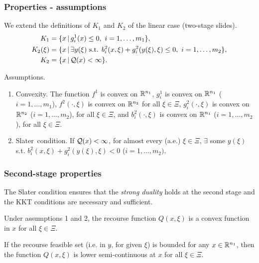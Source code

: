 \documentclass[aspectratio=169]{beamer}
\begin{document}
\begin{frame}
	\frametitle{Properties - assumptions}
	
	We extend the definitions of $K_1$ and $K_2$ of the linear case (two-stage slides).
	\begin{align*}
		K_1 &= \lbrace x \,|\, g_i^1(x) \leq 0,\ i = 1,\ldots,m_1 \rbrace,\\
		K_2(\xi) &= \lbrace x \,|\, \exists y(\xi) \mbox{ s.t. } b_i^2(x,\xi) +
		g_i^2(y(\xi),\xi) \leq 0,\ i = 1,\ldots,m_2 \rbrace,\\
		K_2 &= \lbrace x \,|\, {\mathcal{Q}}(x) < \infty \rbrace.
	\end{align*}
	
	{\blue Assumptions}.
	\begin{enumerate}
		\item \mbox{\red Convexity}.
		The function $f^1$ is convex on ${\mathbb{R}}^{n_1}$, $g_i^1$ is convex on ${\mathbb{R}}^{n_1}$ ($i =
		1,\ldots,m_1$), $f^2(\cdot,\xi)$ is convex on ${\mathbb{R}}^{n_2}$ for all $\xi \in \Xi$, $g_i^2(\cdot,\xi)$ is convex on ${\mathbb{R}}^{n_2}$ ($i = 1,\ldots,m_2$), for all $\xi \in \Xi$, and $b_i^2(\cdot, \xi)$ is convex on ${\mathbb{R}}^{n_1}$ ($i = 1,\ldots,m_2$), for all $\xi \in \Xi$.
		\item \mbox{\red Slater condition}.
		If ${\mathcal{Q}}(x) < \infty$, for almost every (a.e.) $\xi \in \Xi$, $\exists$ some $y(\xi)$ s.t. $b_i^2(x, \xi) + g_i^2(y(\xi), \xi) < 0$ ($i = 1,\ldots,m_2)$.
	\end{enumerate}
	
\end{frame}

\begin{frame}
\frametitle{Second-stage properties}

The Slater condition ensures that the \textit{strong duality} holds at the second stage and the KKT conditions are necessary and sufficient.

\mbox{}

\begin{theorem}
Under assumptions 1 and 2, the recourse function $Q(x,\xi)$ is a convex function in $x$ for all $\xi \in \Xi$.
\end{theorem}

\begin{theorem}
If the recourse feasible set (i.e. in $y$, for given $\xi$) is bounded for any $x \in {\mathbb{R}}^{n_1}$, then the function $Q(x,\xi)$ is lower semi-continuous at $x$ for all $\xi \in \Xi$.
\end{theorem}

\end{frame}
\end{document}
